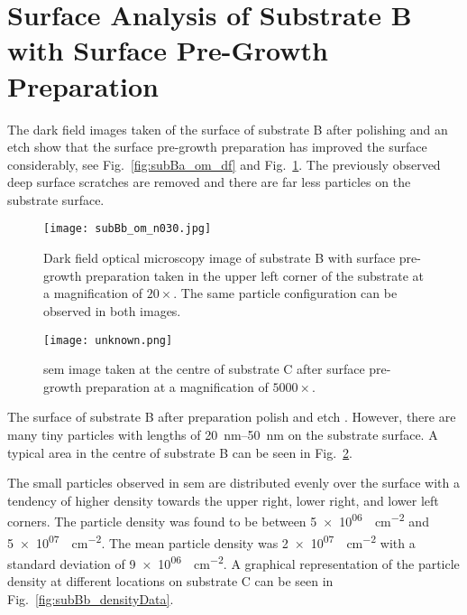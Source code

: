 \clearpage
\section[Surface Analysis of Substrate B with Surface Pre-Growth Preparation]{Surface Analysis of Substrate B with Surface Pre-Growth Preparation%
   }\label{sec:subBb}
   
The dark field images taken of the surface of substrate B after polishing and an etch show that the surface pre-growth preparation has improved the surface considerably, see Fig.~\ref{fig:subBa_om_df} and Fig.~\ref{fig:subBb_om_df}. The previously observed deep surface scratches are removed and there are far less particles on the substrate surface.

\begin{figure}[htbp]
    \centering
    \texttt{[image: subBb\_om\_n030.jpg]}
    \caption[Dark field optical microscopy image of substrate B with surface pre-growth preparation.]{Dark field optical microscopy image of substrate B with surface pre-growth preparation taken in the upper left corner of the substrate at a magnification of $20\times$. The same particle configuration can be observed in both images.}
    \label{fig:subBb_om_df}
\end{figure}
   
   
   
\begin{figure}[htbp]
    \centering
    \texttt{[image: unknown.png]}
    \caption[\Ac{sem} of the centre of substrate B with surface pre-growth preparation.]{\Acf{sem} image taken at the centre of substrate C after surface pre-growth preparation at a  magnification of $5000\times$.}
    \label{fig:subBb_sem_area}
\end{figure}

The surface of substrate B after preparation polish and etch \todo{}. However, there are many tiny particles with lengths of \SIrange{20}{50}{\nano\metre} on the substrate surface. A typical area in the centre of substrate B can be seen in Fig.~\ref{fig:subBb_sem_area}.

The small particles observed in \ac{sem} are distributed evenly over the surface with a tendency of higher density towards the upper right, lower right, and lower left corners. The particle density was found to be between \SI{5e+06}{\particle\centi\metre^{-2}} and \SI{5e+07}{\particle\centi\metre^{-2}}. The mean particle density was \SI{2e+07}{\particle\centi\metre^{-2}} with a standard deviation of \SI{9e+06}{\particle\centi\metre^{-2}}. A graphical representation of the particle density at different locations on substrate C can be seen in Fig.~\ref{fig:subBb_densityData}.

